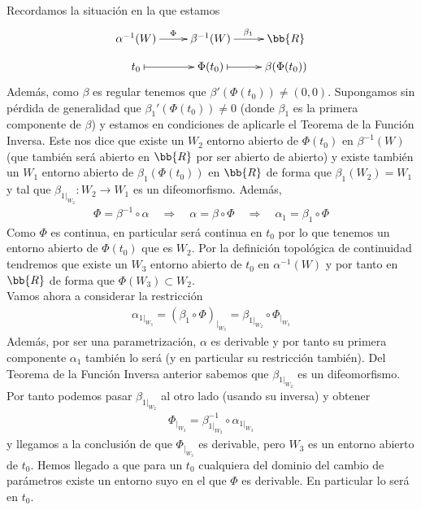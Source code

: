 \begin{ejemplo}
    Recordamos la situación en la que estamos
    \begin{gather*}
        \xymatrix@R=3mm{
            \alpha^{-1}(W) \ar[r]^{\Phi}  & \beta^{-1}(W) \ar[r]^{\beta_1} & \bb{R} \\
            t_0 \ar@{|->}[r] & \Phi(t_0) \ar@{|->}[r] & \beta(\Phi(t_0))
        }
    \end{gather*}
    Además, como $\beta$ es regular tenemos que $\beta'(\Phi(t_0)) \neq (0,0)$. Supongamos sin pérdida de generalidad que $\beta_1'(\Phi(t_0)) \neq 0$ (donde $\beta_1$ es la primera componente de $\beta$) y estamos en condiciones de aplicarle el Teorema de la Función Inversa. Este nos dice que existe un $W_2$ entorno abierto de $\Phi(t_0)$ en $\beta^{-1}(W)$ (que también será abierto en $\bb{R}$ por ser abierto de abierto) y existe también un $W_1$ entorno abierto de $\beta_1(\Phi(t_0))$ en $\bb{R}$ de forma que $\beta_1(W_2) = W_1$ y tal que $\beta_{1|_{W_2}} : W_2 \to W_1$ es un difeomorfismo. Además,
    \begin{gather*}
        \Phi = \beta^{-1}\circ \alpha \quad \Rightarrow \quad \alpha = \beta \circ \Phi \quad \Rightarrow \quad \alpha_1 = \beta_1 \circ \Phi
    \end{gather*}
    Como $\Phi$ es continua, en particular será continua en $t_0$ por lo que tenemos un entorno abierto de $\Phi(t_0)$ que es $W_2$. Por la definición topológica de continuidad tendremos que existe un $W_3$ entorno abierto de $t_0$ en $\alpha^{-1}(W)$ y por tanto en $\bb{R}$ de forma que $\Phi(W_3) \subset W_2$.\\

    Vamos ahora a considerar la restricción
    \begin{gather*}
        \alpha_{1|_{W_3}} = (\beta_1\circ \Phi)_{|_{W_3}} = \beta_{1|_{W_2}} \circ \Phi_{|_{W_3}}
    \end{gather*}
    Además, por ser una parametrización, $\alpha$ es derivable y por tanto su primera componente $\alpha_1$ también lo será (y en particular su restricción también). Del Teorema de la Función Inversa anterior sabemos que $\beta_{1|_{W_2}}$ es un difeomorfismo. Por tanto podemos pasar $\beta_{1|_{W_2}}$ al otro lado (usando su inversa) y obtener
    \begin{gather*}
        \Phi_{|_{W_3}} = \beta_{1|_{W_2}}^{-1} \circ \alpha_{1|_{W_3}}
    \end{gather*}
    y llegamos a la conclusión de que $\Phi_{|_{W_3}}$ es derivable, pero $W_3$ es un entorno abierto de $t_0$. Hemos llegado a que para un $t_0$ cualquiera del dominio del cambio de parámetros existe un entorno suyo en el que $\Phi$ es derivable. En particular lo será en $t_0$.
\end{ejemplo}

